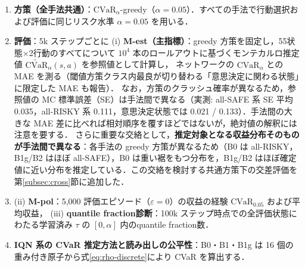 \documentclass[a4paper,10pt]{jsarticle}
\theoremstyle{definition}
\newcommand{\CVaR}{\mathrm{CVaR}}
\begin{document}
\begin{enumerate}
\begin{itemize}
    \item \textbf{B1g 歪み FQF（$g$-一様初期化・主結果）}：B1 と同一だが，FPN の初期 bias を $g$-一様配置 $\tau_i = g^{-1}_{\alpha,\lambda}(i/N)$（実験Aの M1 相当）に初期化し，初期から下側裾に解像度を配分する．
    \item B2 リスク感応 IQN：学習時 $\tau\sim U(0,1)$ 16点，コサイン埋め込み64次元，行動選択時 $\tau\sim U(0,\alpha)$．
    \item \textbf{B2p IQN（学習時歪み $\tau$）}：B2 と同一の構造をもつが，\textbf{学習時のサンプリング（現在側の $\tau_i$ とターゲット側の $\tau'_j$ の双方）}のみ $\tau = g^{-1}_{\alpha,\lambda}(U(0,1))$ に変更し，学習時から解像度を下側裾に集中させる対抗ベースラインである（分位点 Huber 損失の level には現在側 $\tau_i$ を，ターゲット原子の生成にはターゲット側 $\tau'_j$ を用い，重要度重みは付与せず等重み $1/N$ で扱う）．行動選択（$\tau\sim U(0,\alpha)$）と決定的評価グリッドは B2 と完全同一である．
  \end{itemize}
  \item \textbf{方策（全手法共通）}：$\CVaR_\alpha$-greedy（$\alpha=0.05$）．すべての手法で行動選択および評価に同じリスク水準 $\alpha=0.05$ を用いる．
  \item \textbf{評価}：5k ステップごとに (i) \textbf{M-est（主指標）}：greedy 方策を固定し，55状態$\times$2行動のすべてについて $10^4$ 本のロールアウトに基づくモンテカルロ推定値 $\widetilde{\mathrm{CVaR}}_\alpha(s,a)$ を参照値として計算し，
  ネットワークの $\CVaR_\alpha$ との MAE を測る（閾値方策クラス内最良が切り替わる「意思決定に関わる状態」に限定した MAE も報告）．
  なお，方策のクラッシュ確率が異なるため，参照値の MC 標準誤差（SE）は手法間で異なる（実測: all-SAFE 系 SE 平均 0.035，all-RISKY 系 0.111，意思決定状態では 0.021 / 0.133）．手法間の大きな MAE 差に比べれば相対順序を覆すほどではないが，絶対値の解釈には注意を要する．
  さらに重要な交絡として，\textbf{推定対象となる収益分布そのものが手法間で異なる}：各手法の greedy 方策が異なるため（B0 は all-RISKY，B1g/B2 はほぼ all-SAFE），B0 は重い裾をもつ分布を，B1g/B2 はほぼ確定値に近い分布を推定している．この交絡を検討する共通方策下の交差評価を第\ref{subsec:cross}節に追加した．
  \item (ii) \textbf{M-pol}：5{,}000 評価エピソード（$\varepsilon=0$）の収益の経験 $\CVaR_{0.05}$ および平均収益，
  (iii) \textbf{quantile fraction診断}：100k ステップ時点での全評価状態にわたる学習済み $\tau$ の $[0,\alpha]$ 内のquantile fraction数．
  \item \textbf{IQN 系の CVaR 推定方法と読み出しの公平性}：B0・B1・B1g は 16 個の重み付き原子から式\eqref{eq:rho-discrete}により CVaR を算出する．

\end{enumerate}
\end{document}
